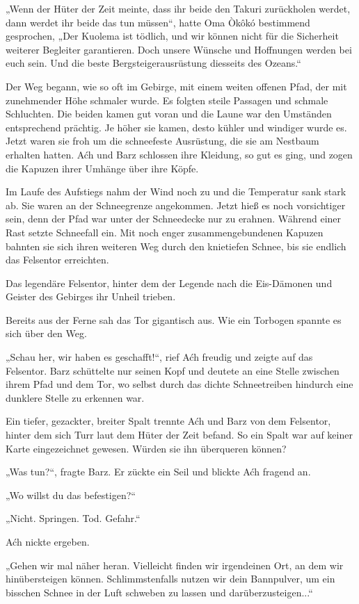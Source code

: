 „Wenn der Hüter der Zeit meinte, dass ihr beide den Takuri zurückholen werdet, dann werdet ihr beide das tun müssen“, hatte Oma Òkôkó bestimmend gesprochen, „Der Kuolema ist tödlich, und wir können nicht für die Sicherheit weiterer Begleiter garantieren. Doch unsere Wünsche und Hoffnungen werden bei euch sein. Und die beste Bergsteigerausrüstung diesseits des Ozeans.“

Der Weg begann, wie so oft im Gebirge, mit einem weiten offenen Pfad, der mit zunehmender Höhe schmaler wurde. Es folgten steile Passagen und schmale Schluchten. Die beiden kamen gut voran und die Laune war den Umständen entsprechend prächtig. Je höher sie kamen, desto kühler und windiger wurde es. Jetzt waren sie froh um die schneefeste Ausrüstung, die sie am Nestbaum erhalten hatten. Aćh und Barz schlossen ihre Kleidung, so gut es ging, und zogen die Kapuzen ihrer Umhänge über ihre Köpfe.

Im Laufe des Aufstiegs nahm der Wind noch zu und die Temperatur sank stark ab. Sie waren an der Schneegrenze angekommen. Jetzt hieß es noch vorsichtiger sein, denn der Pfad war unter der Schneedecke nur zu erahnen. Während einer Rast setzte Schneefall ein. Mit noch enger zusammengebundenen Kapuzen bahnten sie sich ihren weiteren Weg durch den knietiefen Schnee, bis sie endlich das Felsentor erreichten.

Das legendäre Felsentor, hinter dem der Legende nach die Eis-Dämonen und Geister des Gebirges ihr Unheil trieben.

Bereits aus der Ferne sah das Tor gigantisch aus. Wie ein Torbogen spannte es sich über den Weg.

„Schau her, wir haben es geschafft!“, rief Aćh freudig und zeigte auf das Felsentor. Barz schüttelte nur seinen Kopf und deutete an eine Stelle zwischen ihrem Pfad und dem Tor, wo selbst durch das dichte Schneetreiben hindurch eine dunklere Stelle zu erkennen war.

Ein tiefer, gezackter, breiter Spalt trennte Aćh und Barz von dem Felsentor, hinter dem sich Turr laut dem Hüter der Zeit befand. So ein Spalt war auf keiner Karte eingezeichnet gewesen. Würden sie ihn überqueren können?

„Was tun?“, fragte Barz. Er zückte ein Seil und blickte Aćh fragend an.

„Wo willst du das befestigen?“

„Nicht. Springen. Tod. Gefahr.“

Aćh nickte ergeben.

„Gehen wir mal näher heran. Vielleicht finden wir irgendeinen Ort, an dem wir hinübersteigen können. Schlimmstenfalls nutzen wir dein Bannpulver, um ein bisschen Schnee in der Luft schweben zu lassen und darüberzusteigen...“

